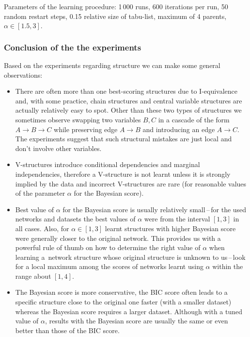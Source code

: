\documentclass[english,cover]{fitthesis} %
\begin{document}

\medskip
Parameters of the learning procedure: 1\,000 runs, 600 iterations per run, 50 random restart steps, 0.15 relative size of tabu-list, maximum of 4 parents, $\alpha \in [1.5, 3]$.




\subsubsection{Conclusion of the the experiments}
Based on the experiments regarding structure we can make some general observations:
\begin{itemize}
    \item There are often more than one best-scoring structures due to I-equivalence and, with some practice, chain structures and central variable structures are actually relatively easy to spot. Other than these two types of structures we sometimes observe swapping two variables $B,C$ in a cascade of the form $A \rightarrow B \rightarrow C$ while preserving edge $A \rightarrow B$ and introducing an edge $A \rightarrow C$. The experiments suggest that such structural mistakes are just local and don't involve other variables.
    \item V-structures introduce conditional dependencies and marginal independencies, therefore a V-structure is not learnt unless it is strongly implied by the data and incorrect V-structures are rare (for reasonable values of the parameter $\alpha$ for the Bayesian score).
    \item Best value of $\alpha$ for the Bayesian score is usually relatively small\,--\,for the used networks and datasets the best values of $\alpha$ were from the interval $[1,3]$ in all cases. Also, for $\alpha \in [1,3]$ learnt structures with higher Bayesian score were generally closer to the original network. This provides us with a powerful rule of thumb on how to determine the right value of $\alpha$ when learning a~network structure whose original structure is unknown to us\,--\,look for a local maximum among the scores of networks learnt using $\alpha$ within the range about $[1,4]$.
    \item The Bayesian score is more conservative, the BIC score often leads to a specific structure close to the original one faster (with a smaller dataset) whereas the Bayesian score requires a larger dataset. Although with a tuned value of $\alpha$, results with the Bayesian score are usually the same or even better than those of the BIC score.
\end{itemize}
\end{document}

